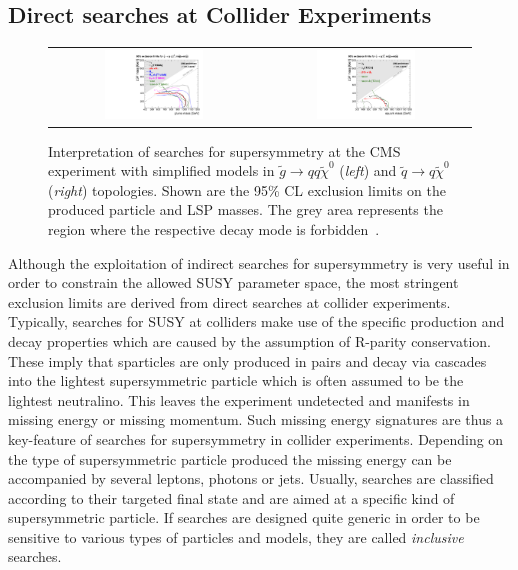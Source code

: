 \subsection{Direct searches at Collider Experiments}
\label{subsec:susy_collider}
\begin{figure}[!tp]
  \centering 
  \begin{tabular}{cc}
    \includegraphics[width=0.49\textwidth]{figures/T1_7TeV.pdf} &
    \includegraphics[width=0.49\textwidth]{figures/T2_7TeV.pdf}
  \end{tabular}
  \caption{Interpretation of searches for supersymmetry at the CMS experiment with simplified models in $\tilde{g} \rightarrow qq\tilde{\chi}^0$ (\textit{left}) and $\tilde{q} \rightarrow q \tilde{\chi}^0$ (\textit{right}) topologies. Shown are the 95\% CL exclusion limits on the produced particle and LSP masses. The grey area represents the region where the respective decay mode is forbidden~\cite{Chatrchyan:2013sza}.}
  \label{fig:SMS_7TeV}
\end{figure}
Although the exploitation of indirect searches for supersymmetry is very useful in order to constrain the allowed SUSY parameter space, the most stringent exclusion limits are derived from direct searches at collider experiments. Typically, searches for SUSY at colliders make use of the specific production and decay properties which are caused by the assumption of R-parity conservation. These imply that sparticles are only produced in pairs and decay via cascades into the lightest supersymmetric particle which is often assumed to be the lightest neutralino. This leaves the experiment undetected and manifests in missing energy or missing momentum. Such missing energy signatures are thus a key-feature of searches for supersymmetry in collider experiments. Depending on the type of supersymmetric particle produced the missing energy can be accompanied by several leptons, photons or jets. Usually, searches are classified according to their targeted final state and are aimed at a specific kind of supersymmetric particle. If searches are designed quite generic in order to be sensitive to various types of particles and models, they are called \textit{inclusive} searches. \\  
